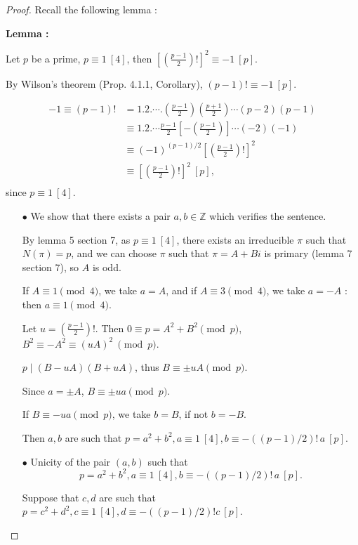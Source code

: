 \documentclass[11pt,a4paper]{article}
\newcommand{\Z}{\mathbb{Z}}
\begin{document}
\begin{proof}
Recall the following lemma : 

{\bf Lemma :} 

Let $p$ be a prime, $p \equiv 1 \ [4]$, then  $\left [ \left ( \frac{p-1}{2} \right)!\right ]^2 \equiv -1 \ [p]$.

By Wilson's theorem (Prop. 4.1.1, Corollary), $(p-1)! \equiv -1 \ [p]$.

\begin{align*}
-1 \equiv (p-1)! &= 1.2. \cdots .\left(\frac{p-1}{2}\right)\left(\frac{p+1}{2}\right)\cdots(p-2)(p-1)\\
&\equiv 1.2.\cdots\frac{p-1}{2}\left[-\left(\frac{p-1}{2}\right)\right]\cdots(-2)(-1) \\
&\equiv (-1)^{(p-1)/2} \left [ \left ( \frac{p-1}{2} \right)!\right ]^2 \\
&\equiv \left [ \left ( \frac{p-1}{2} \right)!\right ]^2 \ [p],\\
\end{align*}
since $p\equiv 1 \ [4]$.
\begin{enumerate}
\item[$\bullet$] We show that there exists a pair $a,b \in \Z$ which verifies the sentence.

By lemma 5 section 7, as $p \equiv 1 \ [4]$, there exists an irreducible $\pi$ such that $N(\pi) = p$, and we can choose $\pi$ such that $\pi = A + Bi$ is primary (lemma 7 section 7), so $A$ is odd.

If $A\equiv 1 \pmod 4$, we take $a=A$, and if $A \equiv 3 \pmod 4$, we take $a = -A$ : then $a \equiv 1 \pmod 4$.

Let $u = \left ( \frac{p-1}{2} \right)!$. Then $0 \equiv p = A^2 + B^2 \pmod p$,  $B^2 \equiv -A^2 \equiv (uA)^2 \ \pmod p$.

$p \mid (B-uA)(B+uA)$, thus $B \equiv \pm uA\pmod p$.

Since $a = \pm A$, $B \equiv \pm ua \pmod p$.

If $B \equiv -ua \pmod p$, we take $b = B$, if not $b = -B$. 

Then $a,b$ are such that $p=a^2+b^2, a\equiv 1 \ [4], b \equiv -((p-1)/2)!\, a\ [p]$.

\item[$\bullet$] Unicity of the pair $(a,b)$ such that
$$p=a^2+b^2, a\equiv 1 \ [4], b \equiv -((p-1)/2)!\, a\ [p].$$

Suppose that $c,d$ are such that $p = c^2+d^2,c\equiv 1 \ [4], d \equiv -((p-1)/2)! c \ [p]$.


\end{enumerate}
\end{proof}
\end{document}
